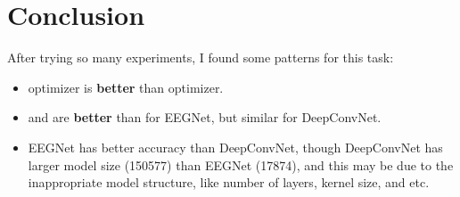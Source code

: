 \chapter{Conclusion}
\indent
	After trying so many experiments, I found some patterns for this task: 
	\begin{itemize}
		\item {} optimizer is \textbf{better} than  optimizer.
		\item {} and  are \textbf{better} than  for EEGNet, but similar for DeepConvNet.
		\item EEGNet has better accuracy than DeepConvNet, 
		though DeepConvNet has larger model size (150577) than EEGNet (17874), and
		this may be due to the inappropriate model structure, 
		like number of layers, kernel size, and etc.
	\end{itemize}
